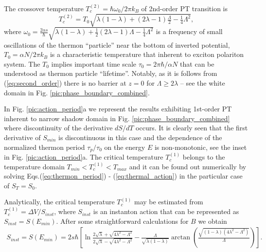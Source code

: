 \documentclass[fleqn,10pt]{wlscirep}
\begin{document}
The crossover temperature $T_{c}^{(2)} = \hbar \omega_0/ 2 \pi k_B$ of 2nd-order PT transition  is 
%
\begin{equation}
T_{c}^{(2)} = T_{0} \sqrt{\lambda (1 - \lambda) + (2 \lambda - 1) \tfrac{\Lambda}{2} - \tfrac{1}{4} \Lambda^2},
\label{eq:second_order}
\end{equation}
%
where  $\omega_0 = \frac{2 \alpha s}{\hbar} \sqrt{\lambda (1 - \lambda) + \tfrac{1}{2} (2 \lambda - 1) \Lambda - \tfrac{1}{4} \Lambda^2}$ is a frequency of small oscillations of the thermon ``particle'' near the bottom of inverted potential,  $T_{0}=\alpha N / 2\pi k_B$ is a characteristic temperature that inherent to exciton polariton system.  The $T_{0}$  implies important time scale $\tau_0=2\pi\hbar/ \alpha N$ that can be understood as thermon particle ``lifetime''. Notably, as it is follows from (\ref{eq:second_order}) there is no barrier at $z = 0$ for $\Lambda \ge 2\lambda$ -- see the white domain in Fig. \ref{pic:phase_boundary_combined}.
 
In Fig. \ref{pic:action_period}a we represent the results exhibiting 1st-order PT inherent to narrow shadow domain in Fig. \ref{pic:phase_boundary_combined} where discontinuity of the derivative $dS / dT$ occurs.
It is clearly seen that the first derivative of $S_{min}$ is discontinuous in this case and the dependence of the normalized thermon period  $\tau_p / \tau_0$ on the energy $E$ is non-monotonic, see the inset in Fig. \ref{pic:action_period}a.
The critical temperature $T_{c}^{(1)}$ belongs to the temperature domain $T_{min} < T_{c}^{(1)} < T_{max}$ and it can be found out numerically by solving Eqs.(\ref{eq:thermon_period}) - (\ref{eq:thermal_action}) in the particular case of $S_T = S_0$.
 
Analytically, the critical temperature $T_{c}^{(1)}$ may be estimated from $T_{c}^{(1)} = \Delta V / S_{inst}$, where $S_{inst}$ is an instanton action that can be represented as $S_{inst} = S(E_{min})$.
After some straightforward calculations for $B$ we obtain
%
\begin{equation}
\begin{array}{c}
S_{inst} = S(E_{min}) = 2 s \hbar \left[ \ln \frac{2 \sqrt{\lambda} + \sqrt{4 \lambda^2 - \Lambda^2}}{2 \sqrt{\lambda} - \sqrt{4 \lambda^2 - \Lambda^2}} - \frac{\Lambda}{\sqrt{\lambda (1 - \lambda)}} \arctan \left( \frac{\sqrt{(1 - \lambda) (4 \lambda^2 - \Lambda^2)}}{\Lambda} \right) \right].
\end{array}
\label{eq:B_action}
\end{equation}
%
\end{document}
